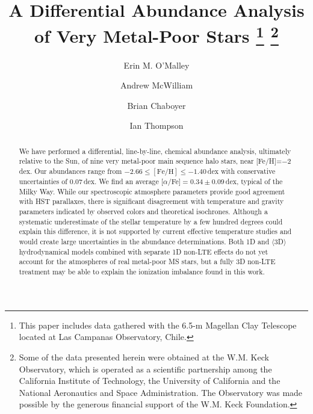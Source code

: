 \documentclass[revtex4]{emulateapj}
\begin{document}

\title{A Differential Abundance Analysis of Very Metal-Poor Stars \footnote{This paper includes data gathered with the 6.5-m Magellan Clay Telescope located at Las Campanas Observatory, Chile.} \footnote{Some of the data presented herein were obtained at the W.M. Keck Observatory, which is operated as a scientific partnership among the California Institute of Technology, the University of California and the National Aeronautics and Space Administration. The Observatory was made possible by the generous financial support of the W.M. Keck Foundation.}}

\author{Erin M. O'Malley}

\author{Andrew McWilliam}

\author{Brian Chaboyer}

\author{Ian Thompson}

\begin{abstract}
We have performed a differential, line-by-line, chemical abundance analysis, ultimately relative to the Sun, of nine very metal-poor main sequence halo stars, near [Fe/H]=$-$2\,dex.  Our abundances range from $-2.66\leq\mathrm{[Fe/H]}\leq-1.40$\,dex with conservative uncertainties of 0.07\,dex.  We find an average [$\alpha$/Fe]$=0.34\pm0.09$\,dex, typical of the Milky Way.  While our spectroscopic atmosphere parameters provide good agreement with HST parallaxes, there is significant disagreement with temperature and gravity parameters indicated by observed colors and theoretical isochrones.  Although a systematic underestimate of the stellar temperature by a few hundred degrees could explain this difference, it is not supported by current effective temperature studies and would create large uncertainties in the abundance determinations.  Both 1D and $\langle$3D$\rangle$ hydrodynamical models combined with separate 1D non-LTE effects do not yet account for the atmospheres of real metal-poor MS stars, but a fully 3D non-LTE treatment may be able to explain the ionization imbalance found in this work.
\end{abstract}
\end{document}
